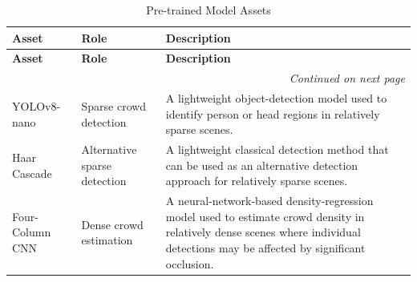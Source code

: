 \documentclass[12pt,a4paper]{report}
\begin{document}
\begin{longtable}{|p{}|p{}|p{}|}
\caption{Pre-trained Model Assets}
\label{tab:pretrained-assets}\\
\hline

\textbf{Asset} &
\textbf{Role} &
\textbf{Description} \\

\hline
\endfirsthead

\hline

\textbf{Asset} &
\textbf{Role} &
\textbf{Description} \\

\hline
\endhead

\hline
\multicolumn{3}{r}{\textit{Continued on next page}}\\
\endfoot

\hline
\endlastfoot

YOLOv8-nano &
Sparse crowd detection &
A lightweight object-detection model used to identify person or head
regions in relatively sparse scenes. \\

\hline

Haar Cascade &
Alternative sparse detection &
A lightweight classical detection method that can be used as an
alternative detection approach for relatively sparse scenes. \\

\hline

Four-Column CNN &
Dense crowd estimation &
A neural-network-based density-regression model used to estimate crowd
density in relatively dense scenes where individual detections may be
affected by significant occlusion. \\

\hline

\end{longtable}



\end{document}
